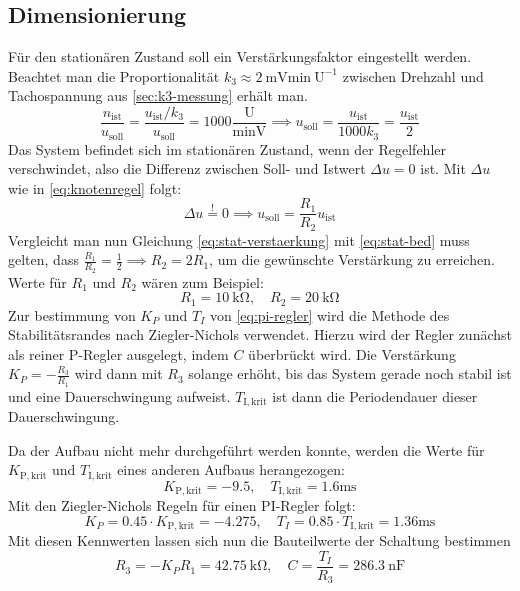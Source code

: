 \subsection{Dimensionierung}

Für den stationären Zustand soll ein Verstärkungsfaktor eingestellt werden. Beachtet man die Proportionalität $k_3\approx\SI{2}{\milli\volt\minute}~\mathrm{U}^{-1}$ zwischen Drehzahl und Tachospannung aus \autoref{sec:k3-messung} erhält man.
\begin{equation}
\frac{n_\text{ist}}{u_\text{soll}} = \frac{u_\text{ist}/k_3}{u_\text{soll}} = 1000\frac{\mathrm{U}}{\si{\minute\volt}} \implies u_\text{soll} = \frac{u_\text{ist}}{1000 k_3} = \frac{u_\text{ist}}{2}\label{eq:stat-verstaerkung}
\end{equation}
Das System befindet sich im stationären Zustand, wenn der Regelfehler verschwindet, also die Differenz zwischen Soll- und Istwert $\Delta u = 0$ ist. Mit $\Delta u$ wie in \autoref{eq:knotenregel} folgt:
\begin{equation}
\Delta u \overset{!}{=} 0 \implies u_\text{soll} = \frac{R_1}{R_2} u_\text{ist}\label{eq:stat-bed}
\end{equation}
Vergleicht man nun Gleichung \ref{eq:stat-verstaerkung} mit \ref{eq:stat-bed} muss gelten, dass $\frac{R_1}{R_2} = \frac{1}{2} \implies R_2 = 2 R_1$, um die gewünschte Verstärkung zu erreichen. Werte für $R_1$ und $R_2$ wären zum Beispiel:
\[
R_1 = \SI{10}{\kilo\ohm}, \quad R_2 = \SI{20}{\kilo\ohm}
\]
Zur bestimmung von $K_P$ und $T_I$ von \autoref{eq:pi-regler} wird die Methode des Stabilitätsrandes nach Ziegler-Nichols verwendet. Hierzu wird der Regler zunächst als reiner P-Regler ausgelegt, indem $C$ überbrückt wird. Die Verstärkung $K_P = -\frac{R_3}{R_1}$ wird dann mit $R_3$ solange erhöht, bis das System gerade noch stabil ist und eine Dauerschwingung aufweist. $T_\mathrm{I,krit}$ ist dann die Periodendauer dieser Dauerschwingung.

Da der Aufbau nicht mehr durchgeführt werden konnte, werden die Werte für $K_\mathrm{P,krit}$ und $T_\mathrm{I,krit}$ eines anderen Aufbaus herangezogen:
\[
K_\mathrm{P,krit} = -9.5, \quad T_\mathrm{I,krit} = 1.6\si{\milli\second}
\]
Mit den Ziegler-Nichols Regeln für einen PI-Regler \cite[S.~127, Tab.~6.1]{EMTPraktikum2025} folgt:
\[
K_P = 0.45\cdot K_\mathrm{P,krit} = -4.275, \quad T_I = 0.85\cdot T_\mathrm{I,krit} = 1.36\si{\milli\second}
\]
Mit diesen Kennwerten lassen sich nun die Bauteilwerte der Schaltung bestimmen
\[
R_3 = -K_P R_1 = \SI{42.75}{\kilo\ohm}, \quad C = \frac{T_I}{R_3} = \SI{286.3}{\nano\farad}
\]

